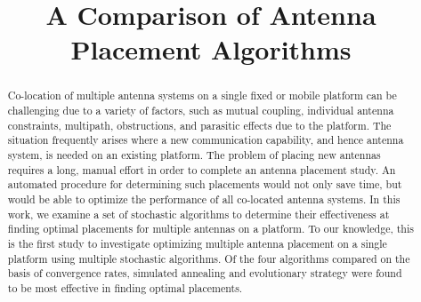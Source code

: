 \documentclass[conference]{IEEEtran}
\begin{document}
%
\title{A Comparison of Antenna Placement Algorithms}

\author{
}
\maketitle
\begin{abstract}
Co-location of multiple antenna systems on a single fixed or mobile platform can be challenging due to a variety of factors, such as mutual coupling, individual antenna constraints, multipath, obstructions, and parasitic effects due to the platform. The situation frequently arises where a new communication capability, and hence antenna system, is needed on an existing platform. The problem of placing new antennas requires a long, manual effort in order to complete an antenna placement study. An automated procedure for determining such placements would not only save time, but would be able to optimize the performance of all co-located antenna systems. In this work, we examine a set of stochastic algorithms to determine their effectiveness at finding optimal placements for multiple antennas on a platform. To our knowledge, this is the first study to investigate optimizing multiple antenna placement on a single platform using multiple stochastic algorithms. Of the four algorithms compared on the basis of convergence rates, simulated annealing and evolutionary strategy were found to be most effective in finding optimal placements.
\end{abstract}





%
\IEEEpeerreviewmaketitle
\end{document}
